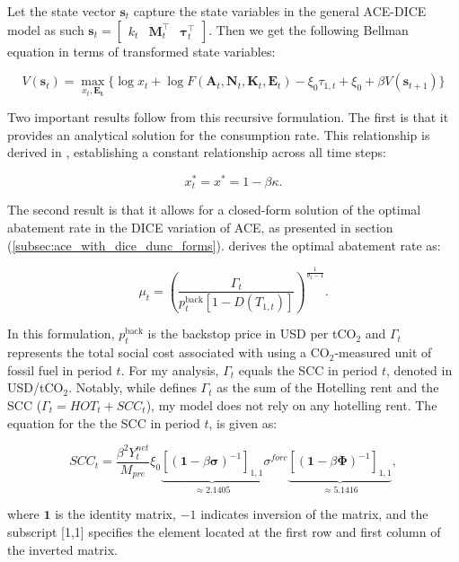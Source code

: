 Let the state vector \(\bm{s}_t\) capture the state variables in the general ACE-DICE model as such \(\bm{s}_t = \begin{bmatrix} k_t & \bm{M}_t^\top & \bm{\tau}_t^\top \end{bmatrix}\). Then we get the following Bellman equation in terms of transformed state variables:

\begin{equation}
    V(\bm{s}_t) = \max_{x_t, \bm{E_t}} \Bigg\{ \log x_t 
        + \log F(\bm{A}_t,\bm{N}_t,\bm{K}_t,\bm{E}_t)
        - \xi_0\tau_{1,t} + \xi_0
        + \beta V(\bm{s}_{t+1}) \Bigg \}
\label{eq:bellman_equation_tranformed_states}
\end{equation}

Two important results follow from this recursive formulation. The first is that it provides an analytical solution for the consumption rate. This relationship is derived in \textcite{TraegerChristian2023ACE}, establishing a constant relationship across all time steps:

\begin{equation}
    x_t^* = x^*= 1 - \beta\kappa.
\label{eq:analytical_x_t}
\end{equation}

The second result is that it allows for a closed-form solution of the optimal abatement rate in the DICE variation of ACE, as presented in section (\ref{subsec:ace_with_dice_dunc_forms}). \textcite{traeger2021analytic_discussion} derives the optimal abatement rate as:

\begin{equation}
    \mu_t = \left( \frac{\Gamma_t}{p_t^\text{back}[1-D(T_{1,t})]} \right)^{\frac{1}{\theta_2 - 1}} .
\label{eq:analytical_abatement_rate}
\end{equation}

In this formulation, \(p_t^\text{back}\) is the backstop price in USD per tCO$_2$ and $\Gamma_t$ represents the total social cost associated with using a CO$_2$-measured unit of fossil fuel in period \(t\). For my analysis, $\Gamma_t$ equals the SCC in period \(t\), denoted in USD/tCO$_2$. Notably, while \textcite{traeger2021analytic_discussion} defines $\Gamma_t$ as the sum of the Hotelling rent and the SCC ($\Gamma_t = HOT_t + SCC_t$), my model does not rely on any hotelling rent. The equation for the the SCC in period \(t\), is given as:

\begin{equation}
    SCC_t = \frac{\beta^2 Y_t^{net}}{M_{pre}} \xi_0 \underbrace{[(\bm{1}-\beta\bm{\sigma})^{-1}]_{1,1}}_{\approx 2.1405} \sigma^{forc}\underbrace{[(\bm{1}-\beta\bm{\Phi})^{-1}]_{1,1}}_{\approx 5.1416},
\label{eq:analytical_scc}
\end{equation}

where \(\bm{1}\) is the identity matrix, \(-1\) indicates inversion of the matrix, and the subscript [1,1] specifies the element located at the first row and first column of the inverted matrix.